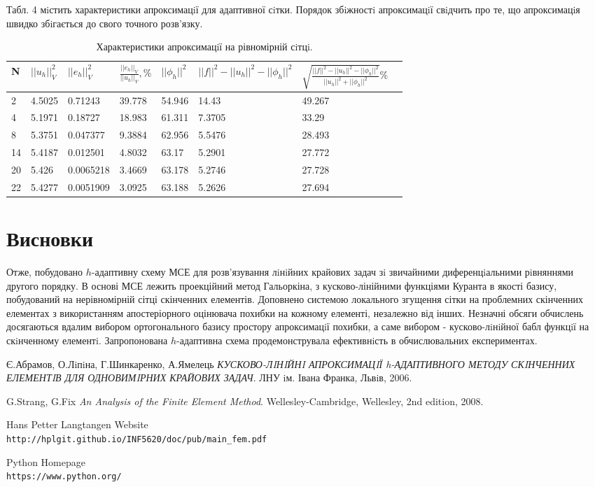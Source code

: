 \documentclass[a4paper]{article}
\numberwithin{equation}{section}
\begin{document}
Табл. 4 мiстить характеристики апроксимацiї для адаптивної сiтки. Порядок збiжностi апроксимацiї свiдчить про те, що апроксимацiя швидко збiгається до свого точного розв’язку.

\begin{table}[H]
\centering
\begin{tabular}{|l|l|l|l|l|l|l|l|}
\hline
N   & $ ||u_h||_V^2 $ & $ ||e_h||_V^2 $ & $ \frac{||e_h||_V}{||u_h||_V}, \% $ & $ ||\phi_h||^2 $ & $ ||f||^2 - ||u_h||^2 - ||\phi_h||^2 $ & $ \sqrt{\frac{||f||^2 - ||u_h||^2 - ||\phi_h||^2}{||u_h||^2 + ||\phi_h||^2}} \% $ \\ \hline
2 & 4.5025 & 0.71243 & 39.778 & 54.946 & 14.43 & 49.267 \\ \hline
4 & 5.1971 & 0.18727 & 18.983 & 61.311 & 7.3705 & 33.29 \\ \hline
8 & 5.3751 & 0.047377 & 9.3884  & 62.956 & 5.5476 & 28.493 \\ \hline
14 & 5.4187 & 0.012501 & 4.8032 & 63.17 & 5.2901 & 27.772 \\ \hline
20 & 5.426 & 0.0065218 & 3.4669  & 63.178 & 5.2746 & 27.728 \\ \hline
22 & 5.4277 & 0.0051909 & 3.0925 & 63.188 & 5.2626 & 27.694 \\ \hline

\end{tabular}
\caption{Характеристики апроксимацiї на рівномірній сiтцi.}
\end{table}

\newpage
\section{Висновки}
Отже, побудовано $h$-адаптивну схему МСЕ для розв’язування лiнiйних крайових задач зi звичайни\-ми диференцiальними рiвняннями другого порядку. В основі МСЕ лежить проекційний метод Галь\-оркіна, з кусково-лінійними функціями Куранта в якості базису, побудований на нерівномірній сітці скінченних елементів. Доповнено системою локального згущення сітки на проблемних скінченних елементах з використанням апостеріорного оцінювача похибки на кожному елементі, незалежно від інших. Незначні обсяги обчислень досягаються вдалим вибором ортогонального базису простору апроксимацiї похибки, а саме
вибором - кусково-лiнiйної бабл функцiї на скiнченному елементi. Запропонована $h$-адаптивна схема продемонструвала ефективнiсть в обчислювальних експеримен\-тах.
\newpage
\begin{thebibliography}{9}
Є.Абрамов, О.Лiпiна, Г.Шинкаренко, А.Ямелець 
\textit{КУСКОВО-ЛIНIЙНI АПРОКСИМАЦIЇ h-АДАПТИВНОГО МЕТОДУ СКIНЧЕННИХ ЕЛЕМЕНТIВ ДЛЯ ОДНОВИМIРНИХ КРАЙОВИХ ЗАДАЧ}. 
ЛНУ iм. Iвана Франка, Львiв, 2006.
 
G.Strang, G.Fix
\textit{An Analysis of the Finite Element Method}. 
Wellesley-Cambridge, Wellesley, 2nd edition, 2008.

 
Hans Petter Langtangen Website
\\\texttt{http://hplgit.github.io/INF5620/doc/pub/main\_fem.pdf}

Python Homepage
\\\texttt{https://www.python.org/}


\end{thebibliography}
\end{document}
